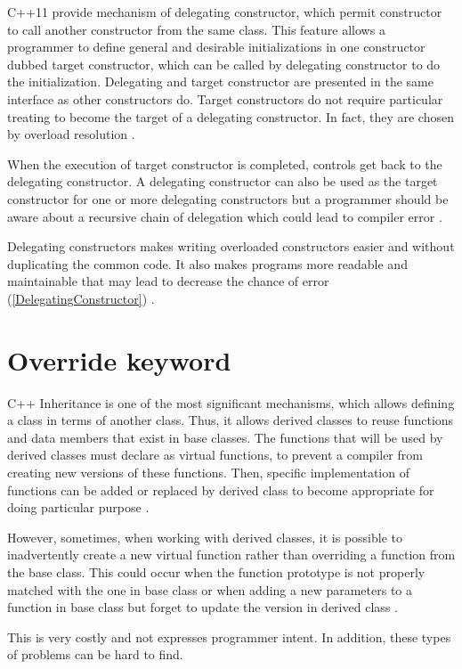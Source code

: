 \documentclass[11pt]{report}
\begin{document}
C++11 provide mechanism of delegating constructor, which permit constructor to call another constructor from the same class. This feature allows a programmer to define general and desirable initializations in one constructor dubbed target constructor, which can be called by delegating constructor to do the initialization. Delegating and target constructor are presented in the same interface as other constructors do. Target constructors do not require particular treating to become the target of a delegating constructor. In fact, they are chosen by overload resolution \cite{Overland:2011:CWF}.


When the execution of target constructor is completed, controls get back to the delegating constructor. A delegating constructor can also be used as the target constructor for one or more delegating constructors but a programmer should be aware about a recursive chain of delegation which could lead to compiler error \cite{Overland:2011:CWF}.


Delegating constructors makes writing overloaded constructors easier and without duplicating the common code. It also makes programs more readable and maintainable that may lead to decrease the chance of error (\ref{DelegatingConstructor}) \cite{Overland:2011:CWF}.

\section{Override keyword}
\label{section: Override keyword}
C++ Inheritance is one of the most significant mechanisms, which allows defining a class in terms of another class. Thus, it allows derived classes to reuse functions and data members that exist in base classes. The functions that will be used by derived classes must declare as virtual functions, to prevent a compiler from creating new versions of these functions. Then, specific implementation of functions can be added or replaced by derived class to become appropriate for doing particular purpose \cite{Stroustrup:2012:Cpp11}.


However, sometimes, when working with derived classes, it is possible to inadvertently create a new virtual function rather than overriding a function from the base class. This could occur when the function prototype is not properly matched with the one in base class or when adding a new parameters to a function in base class but forget to update the version in derived class \cite{Stroustrup:2012:Cpp11}.


This is very costly and not expresses programmer intent. In addition, these types of problems can be hard to find.
\end{document}
